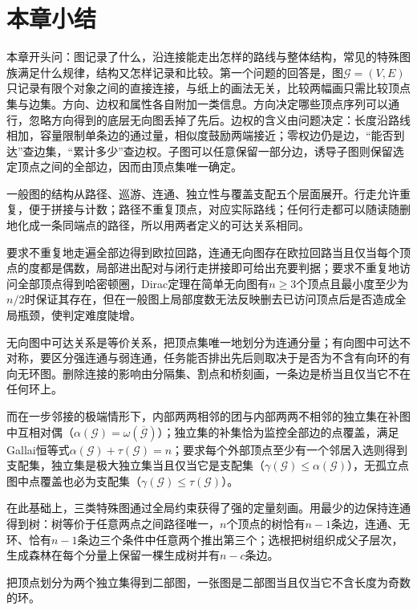 \section{本章小结}
\label{sec:graph-objects-summary}

本章开头问：图记录了什么，沿连接能走出怎样的路线与整体结构，常见的特殊图族满足什么规律，结构又怎样记录和比较。第一个问题的回答是，图$\mathcal G=(V,E)$只记录有限个对象之间的直接连接，与纸上的画法无关，比较两幅画只需比较顶点集与边集。方向、边权和属性各自附加一类信息。方向决定哪些顶点序列可以通行，忽略方向得到的底层无向图丢掉了先后。边权的含义由问题决定：长度沿路线相加，容量限制单条边的通过量，相似度鼓励两端接近；零权边仍是边，“能否到达”查边集，“累计多少”查边权。子图可以任意保留一部分边，诱导子图则保留选定顶点之间的全部边，因而由顶点集唯一确定。

一般图的结构从路径、巡游、连通、独立性与覆盖支配五个层面展开。行走允许重复，便于拼接与计数；路径不重复顶点，对应实际路线；任何行走都可以随读随删地化成一条同端点的路径，所以用两者定义的可达关系相同。

要求不重复地走遍全部边得到欧拉回路，连通无向图存在欧拉回路当且仅当每个顶点的度都是偶数，局部进出配对与闭行走拼接即可给出充要判据；要求不重复地访问全部顶点得到哈密顿圈，Dirac定理在简单无向图有$n\geq3$个顶点且最小度至少为$n/2$时保证其存在，但在一般图上局部度数无法反映删去已访问顶点后是否造成全局瓶颈，使判定难度陡增。

无向图中可达关系是等价关系，把顶点集唯一地划分为连通分量；有向图中可达不对称，要区分强连通与弱连通，任务能否排出先后则取决于是否为不含有向环的有向无环图。删除连接的影响由分隔集、割点和桥刻画，一条边是桥当且仅当它不在任何环上。

而在一步邻接的极端情形下，内部两两相邻的团与内部两两不相邻的独立集在补图中互相对偶（$\alpha(\mathcal G)=\omega(\overline{\mathcal G})$）；独立集的补集恰为监控全部边的点覆盖，满足Gallai恒等式$\alpha(\mathcal G)+\tau(\mathcal G)=n$；要求每个外部顶点至少有一个邻居入选则得到支配集，独立集是极大独立集当且仅当它是支配集（$\gamma(\mathcal G)\leq\alpha(\mathcal G)$），无孤立点图中点覆盖也必为支配集（$\gamma(\mathcal G)\leq\tau(\mathcal G)$）。

在此基础上，三类特殊图通过全局约束获得了强的定量刻画。用最少的边保持连通得到树：树等价于任意两点之间路径唯一，$n$个顶点的树恰有$n-1$条边，连通、无环、恰有$n-1$条边三个条件中任意两个推出第三个；选根把树组织成父子层次，生成森林在每个分量上保留一棵生成树并有$n-c$条边。

把顶点划分为两个独立集得到二部图，一张图是二部图当且仅当它不含长度为奇数的环。

